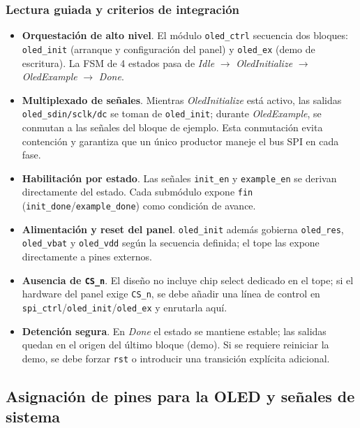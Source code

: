 \documentclass[a4paper,12pt]{article}
\begin{document}
\subsubsection*{Lectura guiada y criterios de integración}
\begin{itemize}
  \item \textbf{Orquestación de alto nivel}. El módulo \texttt{oled\_ctrl} secuencia dos bloques: \texttt{oled\_init} (arranque y configuración del panel) y \texttt{oled\_ex} (demo de escritura). La FSM de 4 estados pasa de \emph{Idle} \(\rightarrow\) \emph{OledInitialize} \(\rightarrow\) \emph{OledExample} \(\rightarrow\) \emph{Done}.
  \item \textbf{Multiplexado de señales}. Mientras \emph{OledInitialize} está activo, las salidas \texttt{oled\_sdin/sclk/dc} se toman de \texttt{oled\_init}; durante \emph{OledExample}, se conmutan a las señales del bloque de ejemplo. Esta conmutación evita contención y garantiza que un único productor maneje el bus SPI en cada fase.
  \item \textbf{Habilitación por estado}. Las señales \texttt{init\_en} y \texttt{example\_en} se derivan directamente del estado. Cada submódulo expone \texttt{fin} (\texttt{init\_done}/\texttt{example\_done}) como condición de avance.
  \item \textbf{Alimentación y reset del panel}. \texttt{oled\_init} además gobierna \texttt{oled\_res}, \texttt{oled\_vbat} y \texttt{oled\_vdd} según la secuencia definida; el tope las expone directamente a pines externos.
  \item \textbf{Ausencia de \texttt{CS\_n}}. El diseño no incluye chip select dedicado en el tope; si el hardware del panel exige \texttt{CS\_n}, se debe añadir una línea de control en \texttt{spi\_ctrl}/\texttt{oled\_init}/\texttt{oled\_ex} y enrutarla aquí.
  \item \textbf{Detención segura}. En \emph{Done} el estado se mantiene estable; las salidas quedan en el origen del último bloque (demo). Si se requiere reiniciar la demo, se debe forzar \texttt{rst} o introducir una transición explícita adicional.
\end{itemize}


\subsection{Asignación de pines para la OLED y señales de sistema}
\label{sec:oled_pines}
\end{document}
